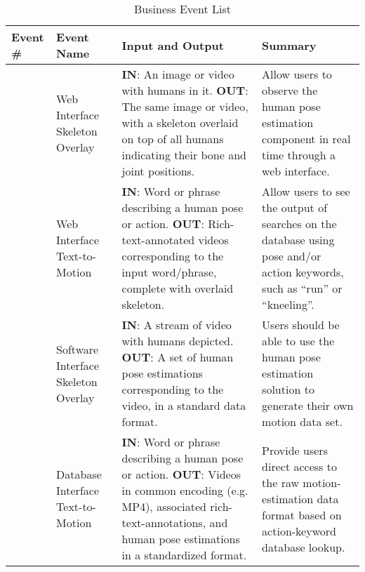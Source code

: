 \documentclass{scrreprt}
\begin{document}
\begin{table}
\begin{enumerate}
\caption{Business Event List}
\label{business-event-list-table}
    \begin{tabular}{  p{1cm} | p{3cm} | p{5cm} | p{5cm} }
    \hline
    Event \# & Event Name & Input and Output & Summary \\
    \hline
    \item \label{web-skeleton-event}
            & Web Interface Skeleton Overlay
            & \textbf{IN}: An image or video with humans in it.\newline
            \textbf{OUT}: The same image or video, with a skeleton overlaid on
            top of all humans indicating their bone and joint positions.
            & Allow users to observe the human pose estimation component in
            real time through a web interface.\\
    \item \label{web-text-to-motion-event}
            & Web Interface Text-to-Motion
            & \textbf{IN}: Word or phrase describing a human pose or action.\newline
            \textbf{OUT}: Rich-text-annotated videos corresponding to the input
            word/phrase, complete with overlaid skeleton.
            & Allow users to see the output of searches on the database using
            pose and/or action keywords, such as ``run'' or ``kneeling''.\\
    \item \label{software-skeleton-event}
            & Software Interface Skeleton Overlay
            & \textbf{IN}: A stream of video with humans depicted.\newline
            \textbf{OUT}: A set of human pose estimations corresponding to the
            video, in a standard data format.
            & Users should be able to use the human pose estimation solution to
            generate their own motion data set.\\
    \item \label{database-text-to-motion-event}
            & Database Interface Text-to-Motion
            & \textbf{IN}: Word or phrase describing a human pose or action.\newline
            \textbf{OUT}: Videos in common encoding (e.g. MP4), associated
            rich-text-annotations, and human pose estimations in a standardized
            format.
            & Provide users direct access to the raw motion-estimation data
            format based on action-keyword database lookup.\\
    \hline
    \end{tabular}
\end{enumerate}
\end{table}
\end{document}
